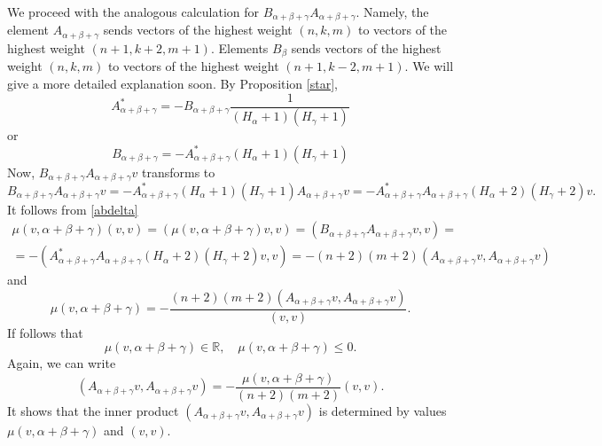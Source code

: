 \documentclass[twoside,a4paper,12pt]{article}
\newcommand{\R}{\ensuremath{\mathbb R}}
\theoremstyle{definition}
\begin{document}
We proceed with the analogous calculation for
$B_{\alpha+\beta+\gamma}A_{\alpha+\beta+\gamma}$. Namely, the element
$A_{\alpha+\beta+\gamma}$ sends vectors of the highest weight $(n,k,m)$ to
vectors of the highest weight $(n+1,k+2,m+1)$. Elements $B_\beta$ sends vectors
of the highest weight $(n,k,m)$ to vectors of the highest weight
$(n+1,k-2,m+1)$. We will give a more detailed explanation soon.
By Proposition \ref{star},
\begin{equation}\label{astar}
	A_{\alpha+\beta+\gamma}^*=
	-B_{\alpha+\beta+\gamma}\frac1{(H_\alpha+1)(H_\gamma+1)}
\end{equation}
or
\begin{equation*}
	B_{\alpha+\beta+\gamma}=-A_{\alpha+\beta+\gamma}^*(H_\alpha+1)(H_\gamma+1)
\end{equation*}
Now, $B_{\alpha+\beta+\gamma}A_{\alpha+\beta+\gamma}v$ transforms to
\begin{equation*}
	B_{\alpha+\beta+\gamma}A_{\alpha+\beta+\gamma}v=
	-A_{\alpha+\beta+\gamma}^*(H_\alpha+1)(H_\gamma+1)
		A_{\alpha+\beta+\gamma}v=
	-A_{\alpha+\beta+\gamma}^*A_{\alpha+\beta+\gamma}(H_\alpha+2)(H_\gamma+2)v.
\end{equation*}
It follows from \eqref{abdelta}
\begin{gather*}
	\mu(v,\alpha+\beta+\gamma)(v,v)=(\mu(v,\alpha+\beta+\gamma)v,v)=
	(B_{\alpha+\beta+\gamma}A_{\alpha+\beta+\gamma}v,v)=\\
	=-(A_{\alpha+\beta+\gamma}^*A_{\alpha+\beta+\gamma}(H_\alpha+2)(H_\gamma+2)
		v,v)=
	-(n+2)(m+2)(A_{\alpha+\beta+\gamma}v,A_{\alpha+\beta+\gamma}v)
\end{gather*}
and
\begin{equation*}
	\mu(v,\alpha+\beta+\gamma)=
	-\frac{(n+2)(m+2)(A_{\alpha+\beta+\gamma} v,A_{\alpha+\beta+\gamma}v)}
	{(v,v)}.
\end{equation*}
If follows that
\begin{equation}\label{abcneg}
	\mu(v,\alpha+\beta+\gamma)\in\R,\quad\mu(v,\alpha+\beta+\gamma)\leq0.
\end{equation}
Again, we can write
\begin{equation}\label{abcvabcv}
	(A_{\alpha+\beta+\gamma} v,A_{\alpha+\beta+\gamma}v)
	=-\frac{\mu(v,\alpha+\beta+\gamma)}{(n+2)(m+2)}(v,v).
\end{equation}
It shows that the inner product
$(A_{\alpha+\beta+\gamma} v,A_{\alpha+\beta+\gamma}v)$ is determined by
values $\mu(v,\alpha+\beta+\gamma)$ and $(v,v)$.
\end{document}
